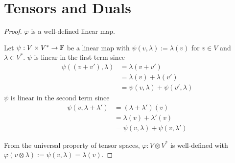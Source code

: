 \section{Tensors and Duals}
\begin{proof} $\varphi$ is a well-defined linear map.\gap

    Let $\psi: V \times V^* \rightarrow \mathbb{F}$ be a linear map with 
    $\psi(v, \lambda) := \lambda(v)$ for $v \in V$ and $\lambda \in V^*$.
    $\psi$ is linear in the first term since
    \begin{align*}
        \psi((v+v'), \lambda) 
        &= \lambda(v+v')\\ 
        &= \lambda(v) + \lambda(v') \\
        &= \psi(v,\lambda) + \psi(v', \lambda)
    \end{align*}
    $\psi$ is linear in the second term since 
    \begin{align*}
        \psi(v, \lambda + \lambda') 
        &= (\lambda + \lambda')(v)\\
        &= \lambda(v) + \lambda'(v)\\
        &= \psi(v, \lambda) + \psi(v, \lambda')
    \end{align*}

    From the universal property of tensor spaces,
    $\varphi: V \otimes V^*$ is well-defined with
    $\varphi(v \otimes \lambda) := \psi(v, \lambda) = \lambda(v)$.
\end{proof}
